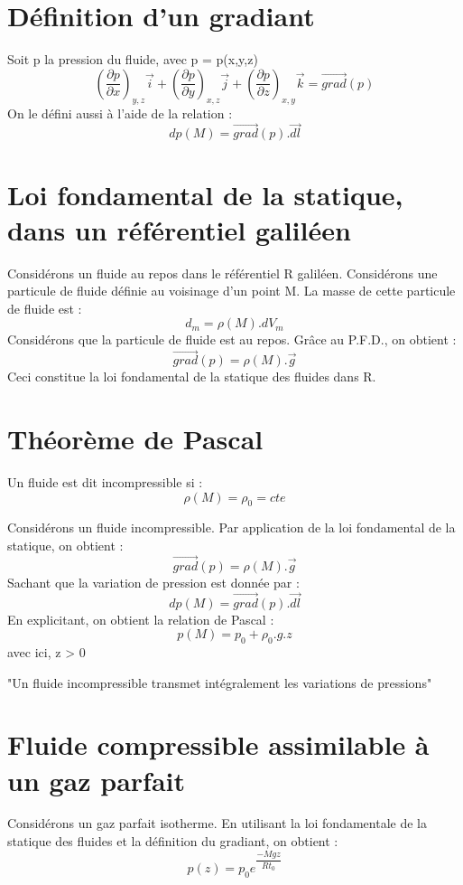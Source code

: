 \section{Définition d'un gradiant}
\begin{de}
Soit p la pression du fluide, avec p = p(x,y,z)
 $$(\dfrac{\partial p}{\partial x})_{y,z}\overrightarrow{i} + (\dfrac{\partial p}{\partial y})_{x,z}\overrightarrow{j} + (\dfrac{\partial p}{\partial z})_{x,y}\overrightarrow{k} = \overrightarrow{grad}(p) $$
On le défini aussi à l'aide de la relation : 
$$dp(M) = \overrightarrow{grad}(p).\overrightarrow{dl}$$
\end{de}
\section{Loi fondamental de la statique, dans un référentiel galiléen}
\begin{de}
Considérons un fluide au repos dans le référentiel R galiléen.
Considérons une particule de fluide définie au voisinage d'un point M.
La masse de cette particule de fluide est :
$$d_m = \rho(M).dV_m$$
Considérons que la particule de fluide est au repos. Grâce au P.F.D., on obtient : 
$$\overrightarrow{grad}(p) = \rho(M).\overrightarrow{g}$$
Ceci constitue la loi fondamental de la statique des fluides dans R.
\end{de}
\section{Théorème de Pascal}
\begin{de}
Un fluide est dit incompressible si :
$$\rho(M)=\rho_0=cte$$
\end{de}
Considérons un fluide incompressible.
Par application de la loi fondamental de la statique, on obtient : 
$$\overrightarrow{grad}(p) = \rho(M).\overrightarrow{g}$$
Sachant que la variation de pression est donnée par : 
$$dp(M) = \overrightarrow{grad}(p).\overrightarrow{dl}$$
En explicitant, on obtient la relation de Pascal :
$$p(M) = p_0 + \rho_0.g.z$$
avec ici, z > 0
\begin{theo}
"Un fluide incompressible transmet intégralement les variations de pressions"
\end{theo}
\section{Fluide compressible assimilable à un gaz parfait}
Considérons un gaz parfait isotherme.
En utilisant la loi fondamentale de la statique des fluides et la définition du gradiant, on obtient : 
$$p(z) = p_0e^{\dfrac{-Mgz}{Rt_0}}$$
